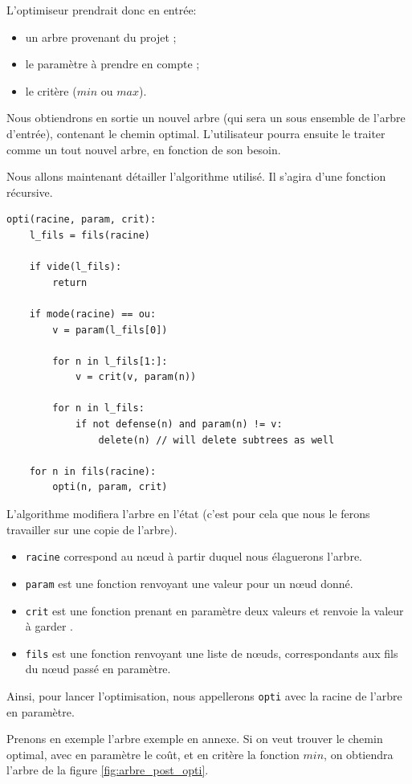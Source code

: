 		L'optimiseur prendrait donc en entrée:
		\begin{itemize}
			\item un arbre provenant du projet ;
			\item le paramètre à prendre en compte ;
			\item le critère ($min$ ou $max$).
		\end{itemize}
		
		Nous obtiendrons en sortie un nouvel arbre (qui sera un sous ensemble de l'arbre d'entrée), contenant le chemin optimal. 
		L'utilisateur pourra ensuite le traiter comme un tout nouvel arbre, en fonction de son besoin.
		
		Nous allons maintenant détailler l'algorithme utilisé. Il s'agira d'une fonction récursive.

		\begin{lstlisting}
opti(racine, param, crit):
	l_fils = fils(racine)

	if vide(l_fils):
		return

	if mode(racine) == ou:
		v = param(l_fils[0])

		for n in l_fils[1:]:
			v = crit(v, param(n))

		for n in l_fils:
			if not defense(n) and param(n) != v:
				delete(n) // will delete subtrees as well
	
	for n in fils(racine):
		opti(n, param, crit)
		\end{lstlisting}

		L'algorithme modifiera l'arbre en l'état (c'est pour cela que nous le ferons travailler sur une copie de l'arbre).
		\begin{itemize}
			\item \verb|racine| correspond au nœud à partir duquel nous élaguerons l'arbre.
			\item \verb|param| est une fonction renvoyant une valeur pour un nœud donné.
			\item \verb|crit| est une fonction prenant en paramètre deux valeurs et renvoie la valeur à \og garder \fg.
			\item \verb|fils| est une fonction renvoyant une liste de nœuds, correspondants aux fils du nœud passé en paramètre.
		\end{itemize}
		Ainsi, pour lancer l'optimisation, nous appellerons \verb|opti| avec la racine de l'arbre en paramètre.

		Prenons en exemple l'arbre exemple en annexe.
		Si on veut trouver le chemin optimal, avec en paramètre le coût, et en critère la fonction $min$, on obtiendra l'arbre de la figure \ref{fig:arbre_post_opti}.

